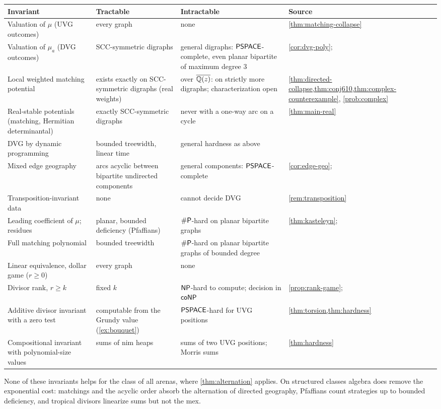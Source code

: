 \begin{center}
\small
\begin{longtable}{@{}L{0.24}L{0.19}L{0.26}L{0.21}@{}}
\toprule
Invariant & Tractable & Intractable & Source\\ \midrule\endhead
Valuation of $\mu$ (UVG outcomes) & every graph & none & \cref{thm:matching-collapse}\\
Valuation of $\mu_a$ (DVG outcomes) & SCC-symmetric digraphs & general digraphs: $\mathsf{PSPACE}$-complete, even planar bipartite of maximum degree $3$ & \cref{cor:dvg-poly}; \cite{LichtensteinSipser}\\
Local weighted matching potential & exists exactly on SCC-symmetric digraphs (real weights) & over $\overline{\mathbb{Q}(z)}$: on strictly more digraphs; characterization open & \cref{thm:directed-collapse,thm:conj610,thm:complex-counterexample}, \cref{prob:complex}\\
Real-stable potentials (matching, Hermitian determinantal) & exactly SCC-symmetric digraphs & never with a one-way arc on a cycle & \cref{thm:main-real}\\
DVG by dynamic programming & bounded treewidth, linear time & general hardness as above & \cite{Bodlaender}\\
Mixed edge geography & arcs acyclic between bipartite undirected components & general components: $\mathsf{PSPACE}$-complete & \cref{cor:edge-geo}; \cite{FSU}\\
Transposition-invariant data & none & cannot decide DVG & \cref{rem:transposition}\\
Leading coefficient of $\mu$; residues & planar, bounded deficiency (Pfaffians) & $\#\mathsf{P}$-hard on planar bipartite graphs & \cref{thm:kasteleyn}; \cite{Vadhan}\\
Full matching polynomial & bounded treewidth & $\#\mathsf{P}$-hard on planar bipartite graphs of bounded degree & \cite{Jerrum,Vadhan}\\
Linear equivalence, dollar game ($r\ge0$) & every graph & none & \cite{BakerShokrieh}\\
Divisor rank, $r\ge k$ & fixed $k$ & $\mathsf{NP}$-hard to compute; decision in $\mathsf{coNP}$ & \cref{prop:rank-game}; \cite{KissToth}\\
Additive divisor invariant with a zero test & computable from the Grundy value (\cref{ex:bouquet}) & $\mathsf{PSPACE}$-hard for UVG positions & \cref{thm:torsion,thm:hardness}\\
Compositional invariant with polynomial-size values & sums of nim heaps & sums of two UVG positions; Morris sums & \cref{thm:hardness}\\
\bottomrule
\end{longtable}
\end{center}

None of these invariants helps for the class of all arenas, where \cref{thm:alternation} applies. On structured classes algebra does remove the exponential cost: matchings and the acyclic order absorb the alternation of directed geography, Pfaffians count strategies up to bounded deficiency, and tropical divisors linearize sums but not the mex.
